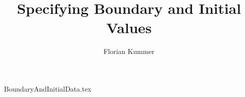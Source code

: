 \documentclass[10pt,a4paper]{article}
\title{Specifying Boundary and Initial Values}
\author{Florian Kummer}
\begin{document}
\maketitle

{BoundaryAndInitialData.tex}
\end{document}
